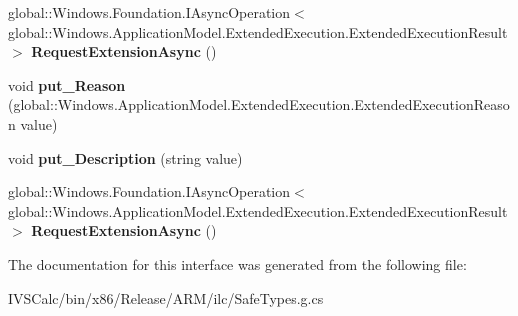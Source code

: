 \begin{DoxyCompactItemize}
global\+::\+Windows.\+Foundation.\+I\+Async\+Operation$<$ global\+::\+Windows.\+Application\+Model.\+Extended\+Execution.\+Extended\+Execution\+Result $>$ {\bfseries Request\+Extension\+Async} ()
\item 
\mbox{\label{interface_windows_1_1_application_model_1_1_extended_execution_1_1_i_extended_execution_session_a5ecf7f48efd35ce9815d586c085ee774}} 
void {\bfseries put\+\_\+\+Reason} (global\+::\+Windows.\+Application\+Model.\+Extended\+Execution.\+Extended\+Execution\+Reason value)
\item 
\mbox{\label{interface_windows_1_1_application_model_1_1_extended_execution_1_1_i_extended_execution_session_a5d1ffef5b854e7f9019b7b153c61fe91}} 
void {\bfseries put\+\_\+\+Description} (string value)
\item 
\mbox{\label{interface_windows_1_1_application_model_1_1_extended_execution_1_1_i_extended_execution_session_a3ae62e16eee49132e7dd5dd891a9c320}} 
global\+::\+Windows.\+Foundation.\+I\+Async\+Operation$<$ global\+::\+Windows.\+Application\+Model.\+Extended\+Execution.\+Extended\+Execution\+Result $>$ {\bfseries Request\+Extension\+Async} ()
\end{DoxyCompactItemize}


The documentation for this interface was generated from the following file\+:\begin{DoxyCompactItemize}
\item 
I\+V\+S\+Calc/bin/x86/\+Release/\+A\+R\+M/ilc/Safe\+Types.\+g.\+cs\end{DoxyCompactItemize}
